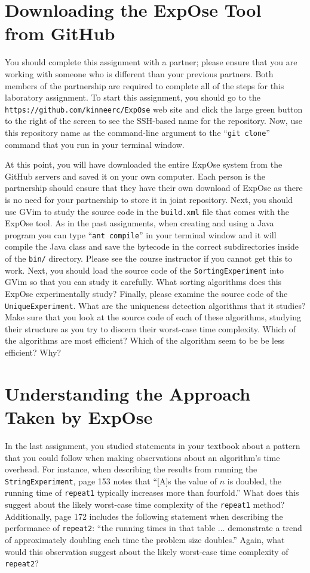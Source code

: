 \section*{Downloading the {\sc ExpOse} Tool from GitHub}

You should complete this assignment with a partner; please ensure that you are working with someone who is different
than your previous partners. Both members of the partnership are required to complete all of the steps for this
laboratory assignment. To start this assignment, you should go to the {\tt https://github.com/kinneerc/ExpOse} web site
and click the large green button to the right of the screen to see the SSH-based name for the repository. Now, use this
repository name as the command-line argument to the ``{\tt git clone}'' command that you run in your terminal window.

At this point, you will have downloaded the entire {\sc ExpOse} system from the GitHub servers and saved it on your own
computer. Each person is the partnership should ensure that they have their own download of {\sc ExpOse} as there is no
need for your partnership to store it in joint repository. Next, you should use GVim to study the source code in the
{\tt build.xml} file that comes with the {\sc ExpOse} tool. As in the past assignments, when creating and using a Java
program you can type ``{\tt ant compile}'' in your terminal window and it will compile the Java class and save the
bytecode in the correct subdirectories inside of the {\tt bin/} directory. Please see the course instructor if you
cannot get this to work. Next, you should load the source code of the {\tt SortingExperiment} into GVim so that you can
study it carefully. What sorting algorithms does this {\sc ExpOse} experimentally study? Finally, please examine the
source code of the {\tt UniqueExperiment}. What are the uniqueness detection algorithms that it studies? Make sure that
you look at the source code of each of these algorithms, studying their structure as you try to discern their worst-case
time complexity. Which of the algorithms are most efficient? Which of the algorithm seem to be be less efficient? Why?

\section*{Understanding the Approach Taken by {\sc ExpOse}}

In the last assignment, you studied statements in your textbook about a pattern that you could follow when making
observations about an algorithm's time overhead. For instance, when describing the results from running the {\tt
StringExperiment}, page 153 notes that ``[A]s the value of $n$ is doubled, the running time of {\tt repeat1} typically
increases more than fourfold.'' What does this suggest about the likely worst-case time complexity of the {\tt repeat1}
method? Additionally, page 172 includes the following statement when describing the performance of {\tt repeat2}: ``the
running times in that table $\ldots$ demonstrate a trend of approximately doubling each time the problem size doubles.''
Again, what would this observation suggest about the likely worst-case time complexity of {\tt repeat2}?

